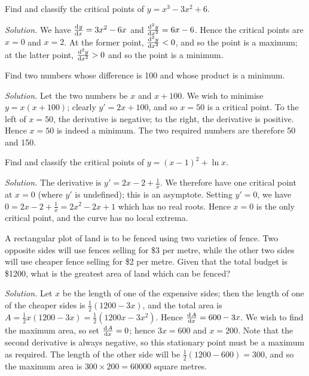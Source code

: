 \begin{ex}
  Find and classify the critical points of $ y = x^3 - 3x^2 + 6 $.

  \textit{Solution.} We have $ \od{y}{x} = 3x^2 - 6x $ and $ \od[2]{y}{x} = 6x - 6 $. Hence
                     the critical points are $ x = 0 $ and $ x = 2 $. At the former point, $ \od[2]{y}{x} < 0 $,
                     and so the point is a maximum; at the latter point, $ \od[2]{y}{x} > 0 $ and so the point is
                     a minimum.
\end{ex}

\begin{ex}
  Find two numbers whose difference is 100 and whose product is a minimum.

  \textit{Solution.} Let the two numbers be $ x $ and $ x + 100 $. We wish to minimise $ y = x(x + 100) $;
  clearly $ y' = 2x + 100 $, and so $ x = 50 $ is a critical point. To the left of $ x = 50 $, the derivative
  is negative; to the right, the derivative is positive. Hence $ x = 50 $ is indeed a minimum. The two required
  numbers are therefore 50 and 150.
\end{ex}

\begin{ex}
  Find and classify the critical points of $ y = (x - 1)^2 + \ln x $.

  \textit{Solution.} The derivative is $ y' = 2x - 2 + \frac{1}{x} $. We therefore have one critical
  point at $ x = 0 $ (where $ y' $ is undefined); this is an asymptote.
  Setting $ y' = 0 $, we have $ 0 = 2x - 2 + \frac{1}{x} = 2x^2 - 2x + 1 $ which has no real roots. Hence $ x = 0 $ is
  the only critical point, and the curve has no local extrema.
\end{ex}

\begin{ex}
  A rectangular plot of land is to be fenced using two varieties of fence. Two opposite sides will
  use fences selling for \$3 per metre, while the other two sides will use cheaper fence selling for \$2 per metre.
  Given that the total budget is \$1200, what is the greatest area of land which can be fenced?

  \textit{Solution.} Let $ x $ be the length of one of the expensive sides; then the length of one of the cheaper
                    sides is $ \frac{1}{2}(1200 - 3x) $, and the total area is $ A = \frac{1}{2} x (1200 - 3x) = \frac{1}{2}(1200x - 3x^2) $.
                    Hence $ \od{A}{x} = 600 - 3x $. We wish to find the maximum area, so set $ \od{A}{x} = 0 $; hence $ 3x = 600 $ and $ x = 200 $.
                    Note that the second derivative is always negative, so this stationary point must be a maximum as required. The length
                    of the other side will be $ \frac{1}{2}(1200 - 600) = 300 $, and so the maximum area is $ 300 \times 200 = 60000 $ square metres.
\end{ex}

